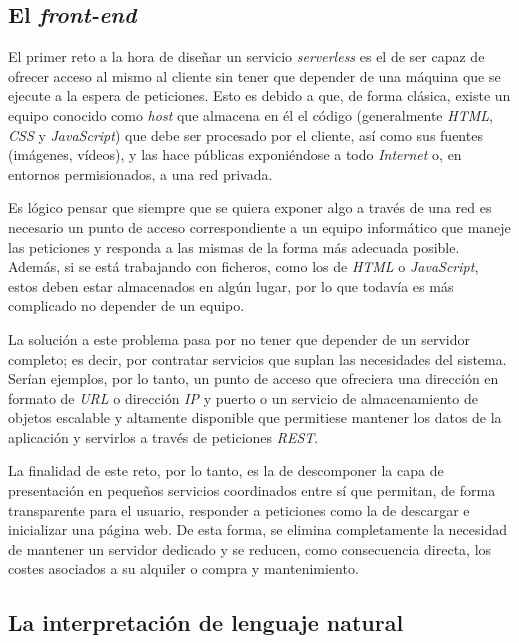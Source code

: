 \documentclass[11pt,spanish,listoffigures]{tfgetsinf}
\begin{document}
\subsection{El \textit{front-end}}
\label{subsec:el-front-end}

El primer reto a la hora de diseñar un servicio \textit{serverless} es el de ser capaz de ofrecer acceso al mismo al cliente sin tener que depender de una máquina que se ejecute a la espera de peticiones. Esto es debido a que, de forma clásica, existe un equipo conocido como \textit{host} que almacena en él el código (generalmente \textit{HTML}, \textit{CSS} y \textit{JavaScript}) que debe ser procesado por el cliente, así como sus fuentes (imágenes, vídeos), y las hace públicas exponiéndose a todo \textit{Internet} o, en entornos permisionados, a una red privada. 

Es lógico pensar que siempre que se quiera exponer algo a través de una red es necesario un punto de acceso correspondiente a un equipo informático que maneje las peticiones y responda a las mismas de la forma más adecuada posible. Además, si se está trabajando con ficheros, como los de \textit{HTML} o \textit{JavaScript}, estos deben estar almacenados en algún lugar, por lo que todavía es más complicado no depender de un equipo. 

La solución a este problema pasa por no tener que depender de un servidor completo; es decir, por contratar servicios que suplan las necesidades del sistema. Serían ejemplos, por lo tanto, un punto de acceso que ofreciera una dirección en formato de \textit{URL} o dirección \textit{IP} y puerto o un servicio de almacenamiento de objetos escalable y altamente disponible que permitiese mantener los datos de la aplicación y servirlos a través de peticiones \textit{REST}.

La finalidad de este reto, por lo tanto, es la de descomponer la capa de presentación en pequeños servicios coordinados entre sí que permitan, de forma transparente para el usuario, responder a peticiones como la de descargar e inicializar una página web. De esta forma, se elimina completamente la necesidad de mantener un servidor dedicado y se reducen, como consecuencia directa, los costes asociados a su alquiler o compra y mantenimiento.

\subsection{La interpretación de lenguaje natural}
\label{subsec:interpretacion-lenguaje-natural}
\end{document}
